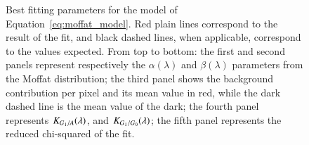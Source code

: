 \begin{figure}%
     \centering
     \caption{Best fitting parameters for the model of Equation~\ref{eq:moffat_model}. Red plain lines correspond to the result of the fit, and black dashed lines, when applicable, correspond to the values expected. From top to bottom: the first and second panels represent respectively the $\alpha(\lambda)$ and $\beta(\lambda)$ parameters from the Moffat distribution; the third panel shows the background contribution per pixel and its mean value in red, while the dark dashed line is the mean value of the dark; the fourth panel represents $K_{G_1/A}(\lambda)$, and $K_{G_1/G_0}(\lambda)$; the fifth panel represents the reduced chi-squared of the fit.}
     \label{fig:result_params}
\end{figure}

%
%
%
%


